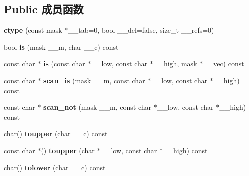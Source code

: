 \subsection*{Public 成员函数}
\begin{DoxyCompactItemize}
\item 
\mbox{\label{classctype_3_01char_01_4_aba54f64eb0b8c574bbdac73c1713007e}} 
{\bfseries ctype} (const mask $\ast$\+\_\+\+\_\+tab=0, bool \+\_\+\+\_\+del=false, size\+\_\+t \+\_\+\+\_\+refs=0)
\item 
\mbox{\label{classctype_3_01char_01_4_a2f4ced75dd84fb8d944ccd6d68752126}} 
bool {\bfseries is} (mask \+\_\+\+\_\+m, char \+\_\+\+\_\+c) const
\item 
\mbox{\label{classctype_3_01char_01_4_a0ecf811df820029011ce36ed262c0da8}} 
const char $\ast$ {\bfseries is} (const char $\ast$\+\_\+\+\_\+low, const char $\ast$\+\_\+\+\_\+high, mask $\ast$\+\_\+\+\_\+vec) const
\item 
\mbox{\label{classctype_3_01char_01_4_a84bb82ccdb7d1e3e61ed2bb92d82c60b}} 
const char $\ast$ {\bfseries scan\+\_\+is} (mask \+\_\+\+\_\+m, const char $\ast$\+\_\+\+\_\+low, const char $\ast$\+\_\+\+\_\+high) const
\item 
\mbox{\label{classctype_3_01char_01_4_a08c4f9d8742e4e7b09c0f93d28c998b5}} 
const char $\ast$ {\bfseries scan\+\_\+not} (mask \+\_\+\+\_\+m, const char $\ast$\+\_\+\+\_\+low, const char $\ast$\+\_\+\+\_\+high) const
\item 
\mbox{\label{classctype_3_01char_01_4_a114caf8f8d4bad4537d66e3495a6b72e}} 
char() {\bfseries toupper} (char \+\_\+\+\_\+c) const
\item 
\mbox{\label{classctype_3_01char_01_4_a35ca3909d9dada0a4f9fca4213c1ee2c}} 
const char $\ast$() {\bfseries toupper} (char $\ast$\+\_\+\+\_\+low, const char $\ast$\+\_\+\+\_\+high) const
\item 
\mbox{\label{classctype_3_01char_01_4_ab70f2828d3673f3c8d28d4404d35cf5e}} 
char() {\bfseries tolower} (char \+\_\+\+\_\+c) const

\end{DoxyCompactItemize}
